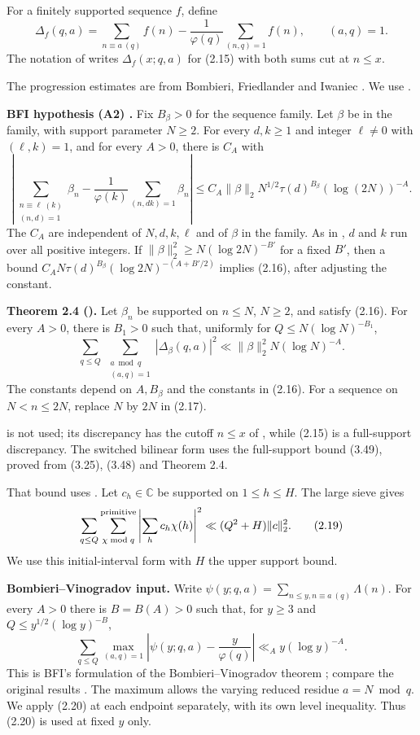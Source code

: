 For a finitely supported sequence $f$, define
\[
 \Delta_f(q,a)=\sum_{n\equiv a\ (q)}f(n)
 -\frac1{\varphi(q)}\sum_{(n,q)=1}f(n),\qquad (a,q)=1.
\tag{2.15}\label{p1:eq:2.15}
\]
The notation of \cite[(1.1)]{BFI86} writes $\Delta_f(x;q,a)$ for (2.15) with both sums cut at $n\le x$.

The progression estimates are from Bombieri, Friedlander and Iwaniec
\cite{BFI86}. We use \cite[(A2), Theorem~0(a), and proof of Theorem~0(a)]{BFI86}.

\textbf{BFI hypothesis (A2) \cite[(A2)]{BFI86}.} Fix $B_\beta>0$ for the sequence family. Let $\beta$ be in the family, with support parameter $N\geq2$. For every $d,k\geq1$ and integer $\ell\ne0$ with $(\ell,k)=1$, and for every $A>0$, there is $C_A$ with
\[
 \left|\sum_{\substack{n\equiv\ell\ (k)\\(n,d)=1}}\beta_n
 -\frac1{\varphi(k)}\sum_{(n,dk)=1}\beta_n\right|
 \leq C_A\|\beta\|_2N^{1/2}\tau(d)^{B_\beta}(\log(2N))^{-A}.
\tag{2.16}\label{p1:eq:2.16}
\]
The $C_A$ are independent of $N,d,k,\ell$ and of $\beta$ in the family. As in \cite{BFI86}, $d$ and $k$ run over all positive integers. If $\|\beta\|_2^2\geq N(\log 2N)^{-B'}$ for a fixed $B'$, then a bound $C_AN\tau(d)^{B_\beta}(\log 2N)^{-(A+B'/2)}$ implies (2.16), after adjusting the constant.

\textbf{Theorem 2.4 (\cite[Theorem~0(a), (2.2)]{BFI86}).} Let $\beta_n$ be supported on $n\leq N$, $N\geq2$, and satisfy (2.16). For every $A>0$, there is $B_1>0$ such that, uniformly for $Q\leq N(\log N)^{-B_1}$,
\[
 \sum_{q\leq Q}\ \sum_{\substack{a\bmod q\\(a,q)=1}}
 |\Delta_\beta(q,a)|^2
 \ll \|\beta\|_2^2N(\log N)^{-A}.
\tag{2.17}\label{p1:eq:2.17}
\]
The constants depend on $A,B_\beta$ and the constants in (2.16). For a sequence on $N<n\leq2N$, replace $N$ by $2N$ in (2.17).

\cite[Theorem~0(b)]{BFI86} is not used; its discrepancy has the cutoff $n\leq x$ of \cite[(1.1)]{BFI86}, while (2.15) is a full-support discrepancy. The switched bilinear form uses the full-support bound (3.49), proved from (3.25), (3.48) and Theorem 2.4.

That bound uses \cite[(1.6)]{BFI86}. Let $c_h\in\mathbb C$ be supported on $1\leq h\leq H$. The large sieve gives
\[
 \sum_{q\leq Q}
 \sum_{\chi\bmod q}^{\rm primitive}
 \left|\sum_hc_h\chi(h)\right|^2
 \ll(Q^2+H)\|c\|_2^2.
\tag{2.19}\label{p1:eq:2.19}
\]
We use this initial-interval form with $H$ the upper support bound.

\textbf{Bombieri--Vinogradov input.} Write $\psi(y;q,a)=\sum_{n\leq y,n\equiv a\ (q)}\Lambda(n)$. For every $A>0$ there is $B=B(A)>0$ such that, for $y\geq3$ and $Q\leq y^{1/2}(\log y)^{-B}$,
\[
 \sum_{q\leq Q}\max_{(a,q)=1}
 \left|\psi(y;q,a)-\frac y{\varphi(q)}\right|
 \ll_A y(\log y)^{-A}.
\tag{2.20}\label{p1:eq:2.20}
\]
This is BFI's formulation of the Bombieri--Vinogradov theorem
\cite[(1.4)]{BFI86}; compare the original results
\cite{Bombieri65,Vinogradov65}. The maximum allows the varying reduced
residue $a=N\bmod q$. We apply (2.20) at each endpoint separately, with
its own level inequality. Thus (2.20) is used at fixed $y$ only.

